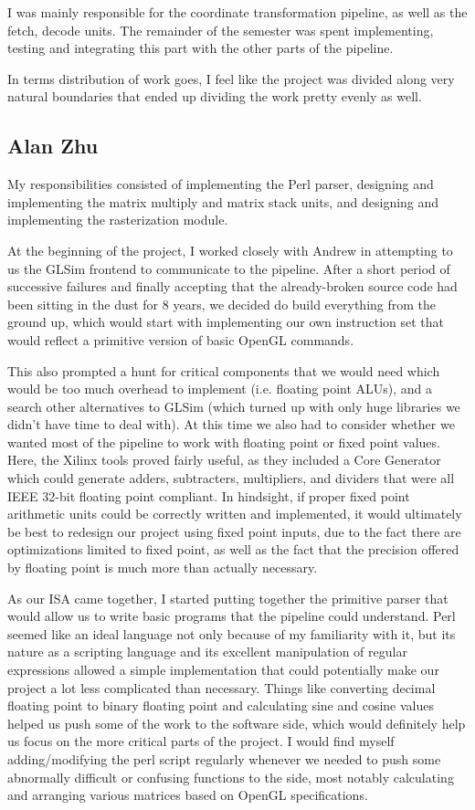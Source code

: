 \documentclass[letterpaper,10pt]{article}
\begin{document}
I was mainly responsible for the coordinate transformation pipeline, as well as the fetch, decode units. The remainder of the semester was spent implementing, testing and integrating this part with the other parts of the pipeline.

In terms distribution of work goes, I feel like the project was divided along very natural boundaries that ended up dividing the work pretty evenly as well.

\subsection{Alan Zhu}
My responsibilities consisted of implementing the Perl parser, designing and implementing the matrix multiply and matrix stack units, and designing and implementing the rasterization module.

At the beginning of the project, I worked closely with Andrew in attempting to us the GLSim frontend to communicate to the pipeline. After a short period of successive failures and finally accepting that the already-broken source code had been sitting in the dust for 8 years, we decided do build everything from the ground up, which would start with implementing our own instruction set that would reflect a primitive version of basic OpenGL commands. 

This also prompted a hunt for critical components that we would need which would be too much overhead to implement (i.e. floating point ALUs), and a search other alternatives to GLSim (which turned up with only huge libraries we didn't have time to deal with). At this time we also had to consider whether we wanted most of the pipeline to work with floating point or fixed point values. Here, the Xilinx tools proved fairly useful, as they included a Core Generator which could generate adders, subtracters, multipliers, and dividers that were all IEEE 32-bit floating point compliant. In hindsight, if proper fixed point arithmetic units could be correctly written and implemented, it would ultimately be best to redesign our project using fixed point inputs, due to the fact there are optimizations limited to fixed point, as well as the fact that the precision offered by floating point is much more than actually necessary.

As our ISA came together, I started putting together the primitive parser that would allow us to write basic programs that the pipeline could understand. Perl seemed like an ideal language not only because of my familiarity with it, but its nature as a scripting language and its excellent manipulation of regular expressions allowed a simple implementation that could potentially make our project a lot less complicated than necessary. Things like converting decimal floating point to binary floating point and calculating sine and cosine values helped us push some of the work to the software side, which would definitely help us focus on the more critical parts of the project. I would find myself adding/modifying the perl script regularly whenever we needed to push some abnormally difficult or confusing functions to the side, most notably calculating and arranging various matrices based on OpenGL specifications.
\end{document}
